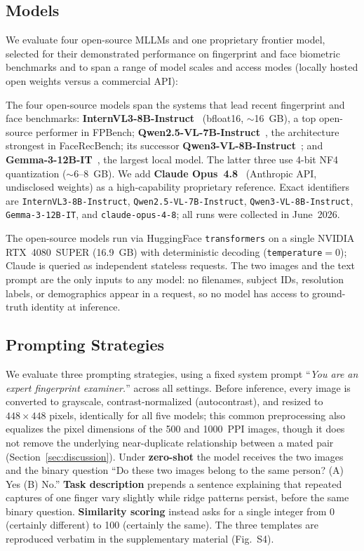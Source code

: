 \documentclass[runningheads]{llncs}
\begin{document}
\subsection{Models}

We evaluate four open-source MLLMs and one proprietary frontier model,
selected for their demonstrated performance on fingerprint and face
biometric benchmarks and to span a range of model scales and access
modes (locally hosted open weights versus a commercial API):

The four open-source models span the systems that lead recent fingerprint and
face benchmarks: \textbf{InternVL3-8B-Instruct}~\cite{internvl3} (bfloat16,
$\sim$16~GB), a top open-source performer in FPBench;
\textbf{Qwen2.5-VL-7B-Instruct}~\cite{qwen25vl}, the architecture strongest in
FaceRecBench; its successor \textbf{Qwen3-VL-8B-Instruct}~\cite{qwen3vl}; and
\textbf{Gemma-3-12B-IT}~\cite{gemma3}, the largest local model. The latter
three use 4-bit NF4 quantization ($\sim$6--8~GB). We add
\textbf{Claude Opus~4.8}~\cite{claudeopus} (Anthropic API, undisclosed weights)
as a high-capability proprietary reference. Exact identifiers are
\texttt{InternVL3-8B-Instruct}, \texttt{Qwen2.5-VL-7B-Instruct},
\texttt{Qwen3-VL-8B-Instruct}, \texttt{Gemma-3-12B-IT}, and
\texttt{claude-opus-4-8}; all runs were collected in June~2026.

The open-source models run via HuggingFace \texttt{transformers} on a single
NVIDIA RTX~4080~SUPER (16.9~GB) with deterministic decoding
(\texttt{temperature}$=0$); Claude is queried as independent stateless
requests. The two images and the text prompt are the only inputs to any
model: no filenames, subject IDs, resolution labels, or demographics appear in
a request, so no model has access to ground-truth identity at inference.

\subsection{Prompting Strategies}
\label{sec:prompts}

We evaluate three prompting strategies, using a fixed system prompt
``\textit{You are an expert fingerprint examiner.}'' across all settings.
Before inference, every image is converted to grayscale, contrast-normalized
(autocontrast), and resized to $448\times448$ pixels, identically for all
five models; this common preprocessing also equalizes the pixel dimensions
of the 500 and 1000~PPI images, though it does not remove the underlying
near-duplicate relationship between a mated pair
(Section~\ref{sec:discussion}).
Under \textbf{zero-shot} the model receives the two images and the binary
question ``Do these two images belong to the same person? (A) Yes (B) No.''
\textbf{Task description} prepends a sentence explaining that repeated captures
of one finger vary slightly while ridge patterns persist, before the same
binary question. \textbf{Similarity scoring} instead asks for a single integer
from 0 (certainly different) to 100 (certainly the same). The three templates
are reproduced verbatim in the supplementary material (Fig.~S4).
\end{document}
